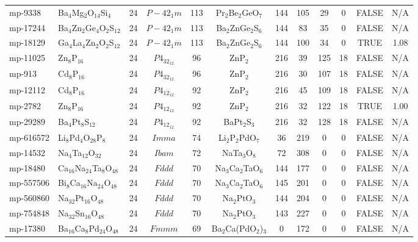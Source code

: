 {\begin{longtable}{llcccccccccc}
    mp-9338 & Ba$_{4}$Mg$_{2}$O$_{14}$Si$_{4}$ & 24    & $P-42_1m$ & 113   & Pr$_{2}$Be$_{2}$GeO$_{7}$ & 144   & 105   & 29    & 0     & FALSE & N/A \\
    mp-17244 & Ba$_{4}$Zn$_{2}$Ge$_{4}$O$_{2}$S$_{12}$ & 24    & $P-42_1m$ & 113   & Ba$_{2}$ZnGe$_{2}$S$_{6}$ & 144   & 83    & 35    & 0     & FALSE & N/A \\
    mp-18129 & Ga$_{4}$La$_{4}$Zn$_{2}$O$_{2}$S$_{12}$ & 24    & $P-42_1m$ & 113   & Ba$_{2}$ZnGe$_{2}$S$_{6}$ & 144   & 100   & 34    & 0     & TRUE  & 1.08  \\
    mp-11025 & Zn$_{8}$P$_{16}$ & 24    & $P4_32_12$ & 96    & ZnP$_{2}$ & 216   & 39    & 125   & 18    & FALSE & N/A \\
    mp-913 & Cd$_{8}$P$_{16}$ & 24    & $P4_32_12$ & 96    & ZnP$_{2}$ & 216   & 30    & 107   & 18    & FALSE & N/A \\
    mp-12112 & Cd$_{8}$P$_{16}$ & 24    & $P4_12_12$ & 92    & ZnP$_{2}$ & 216   & 45    & 109   & 18    & FALSE & N/A \\
    mp-2782 & Zn$_{8}$P$_{16}$ & 24    & $P4_12_12$ & 92    & ZnP$_{2}$ & 216   & 32    & 122   & 18    & TRUE  & 1.00  \\
    mp-29289 & Ba$_{4}$Pt$_{8}$S$_{12}$ & 24    & $P4_12_12$ & 92    & BaPt$_{2}$S$_{3}$ & 216   & 32    & 128   & 18    & FALSE & N/A \\
    mp-616572 & Li$_{8}$Pd$_{4}$O$_{28}$P$_{8}$ & 24    & $Imma$ & 74    & Li$_{2}$P$_{2}$PdO$_{7}$ & 36    & 219   & 0     & 0     & FALSE & N/A \\
    mp-14532 & Na$_{4}$Ta$_{12}$O$_{32}$ & 24    & $Ibam$ & 72    & NaTa$_{3}$O$_{8}$ & 72    & 308   & 0     & 0     & FALSE & N/A \\
    mp-18480 & Ca$_{16}$Na$_{24}$Ta$_{8}$O$_{48}$ & 24    & $Fddd$ & 70    & Na$_{3}$Ca$_{2}$TaO$_{6}$ & 144   & 177   & 0     & 0     & FALSE & N/A \\
    mp-557506 & Bi$_{8}$Ca$_{16}$Na$_{24}$O$_{48}$ & 24    & $Fddd$ & 70    & Na$_{3}$Ca$_{2}$TaO$_{6}$ & 145   & 201   & 0     & 0     & FALSE & N/A \\
    mp-560860 & Na$_{32}$Pt$_{16}$O$_{48}$ & 24    & $Fddd$ & 70    & Na$_{2}$PtO$_{3}$ & 144   & 204   & 0     & 0     & FALSE & N/A \\
    mp-754848 & Na$_{32}$Sn$_{16}$O$_{48}$ & 24    & $Fddd$ & 70    & Na$_{2}$PtO$_{3}$ & 143   & 227   & 0     & 0     & FALSE & N/A \\
    mp-17380 & Ba$_{16}$Ca$_{8}$Pd$_{24}$O$_{48}$ & 24    & $Fmmm$ & 69    & Ba$_{2}$Ca(PdO$_{2}$)$_{3}$ & 0     & 172   & 0     & 0     & FALSE & N/A \\

\end{longtable}}

